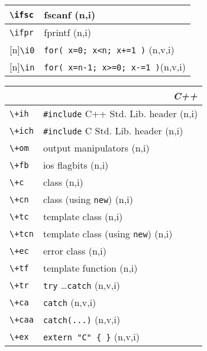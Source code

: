 \documentclass[oneside,11pt,landscape,DIV16]{scrartcl}
\newcommand{\Rep}{{\tiny{[n]}}}
\begin{document}
\begin{multicols}{3}
\begin{center}
\begin{tabular}[]{|p{11mm}|p{60mm}|}
\hline \verb'\ifsc'& fscanf                             \hfill (n,i)\\
\hline \verb'\ifpr'& fprintf                            \hfill (n,i)\\
\hline \Rep\verb'\i0'  & \verb'for( x=0; x<n; x+=1 )'   \hfill (n,v,i)\\
\hline \Rep\verb'\in'  & \verb'for( x=n-1; x>=0; x-=1 )'\hfill (n,v,i)\\
\hline
\end{tabular}
%
%
\begin{tabular}[]{|p{12mm}|p{60mm}|}
\hline 
\multicolumn{2}{|r|}{\textsl{C\textbf{++}}} \\
\hline \verb'\+ih'  & \verb$#include$ C++ Std. Lib. header \hfill (n,i)\\
\hline \verb'\+ich' & \verb$#include$ C   Std. Lib. header \hfill (n,i)\\
\hline \verb'\+om'  & output manipulators                  \hfill (n,i)\\
\hline \verb'\+fb'  & ios flagbits                         \hfill (n,i)\\
\hline
\hline \verb'\+c'   & class                                \hfill (n,i)\\
\hline \verb'\+cn'  & class (using \verb'new')             \hfill (n,i)\\
\hline \verb'\+tc'  & template class                       \hfill (n,i)\\
\hline \verb'\+tcn' & template class (using \verb'new')    \hfill (n,i)\\
\hline \verb'\+ec'  & error class                          \hfill (n,i)\\
\hline \verb'\+tf'  & template function                    \hfill (n,i)\\
\hline
\hline \verb'\+tr'  & \verb'try' \dots \verb'catch'        \hfill (n,v,i)\\
\hline \verb'\+ca'  & \verb'catch'                         \hfill (n,v,i)\\
\hline \verb'\+caa' & \verb'catch(...)'                    \hfill (n,v,i)\\
\hline
\hline \verb'\+ex'  & \verb'extern "C" { }'                \hfill (n,v,i)\\

\end{tabular}
\end{center}
\end{multicols}
\end{document}
